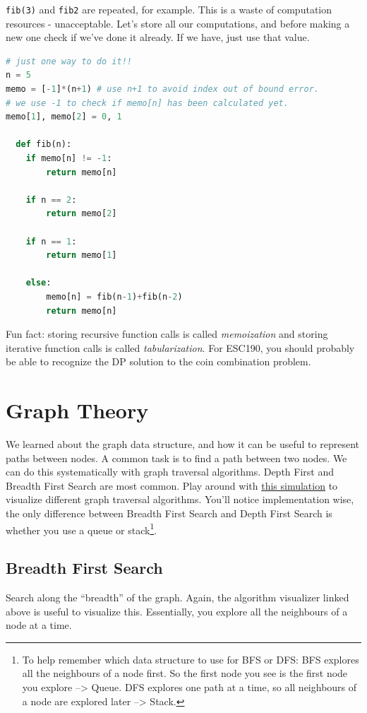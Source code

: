\documentclass{tufte-handout}
\newcommand{\code}[1]{\colorbox{light-gray}{\texttt{#1}}}
\begin{document}
\code{fib(3)} and \code{fib{2}} are repeated, for
example. This is a waste of computation resources -
unacceptable. Let's store all our computations, and before making a
new one check if we've done it already. If we have, just use that
value.

\begin{lstlisting}[language=Python]
# just one way to do it!!
n = 5
memo = [-1]*(n+1) # use n+1 to avoid index out of bound error.
# we use -1 to check if memo[n] has been calculated yet.
memo[1], memo[2] = 0, 1

  def fib(n):
    if memo[n] != -1:
        return memo[n]

    if n == 2:
        return memo[2]

    if n == 1:
        return memo[1]

    else:
        memo[n] = fib(n-1)+fib(n-2)
        return memo[n]
\end{lstlisting}

Fun fact: storing recursive function calls is called
\textit{memoization} and storing iterative function calls is called
\textit{tabularization}. For ESC190, you should probably be able to
recognize the DP solution to the coin combination problem.

\section{Graph Theory}
We learned about the graph data structure, and how it can be useful to
represent paths between nodes. A common task is to find a path between
two nodes. We can do this systematically with graph traversal
algorithms. Depth First and Breadth First Search are most common. Play
around with \href{https://visualgo.net/en/dfsbfs?slide=1}{this
  simulation} to visualize different graph traversal
algorithms. You'll notice implementation wise, the only difference
between Breadth First Search and Depth First Search is whether you use
a queue or stack\footnote{To help remember which data structure to use
for BFS or DFS: BFS explores all the neighbours of a node first. So
the first node you see is the first node you explore --> Queue. DFS
explores one path at a time, so all neighbours of a node are explored
later --> Stack.}. 
\subsection{Breadth First Search}
Search along the ``breadth'' of the graph. Again, the algorithm
visualizer linked above is useful to visualize this. Essentially, you
explore all the neighbours of a node at a time. 
\end{document}
